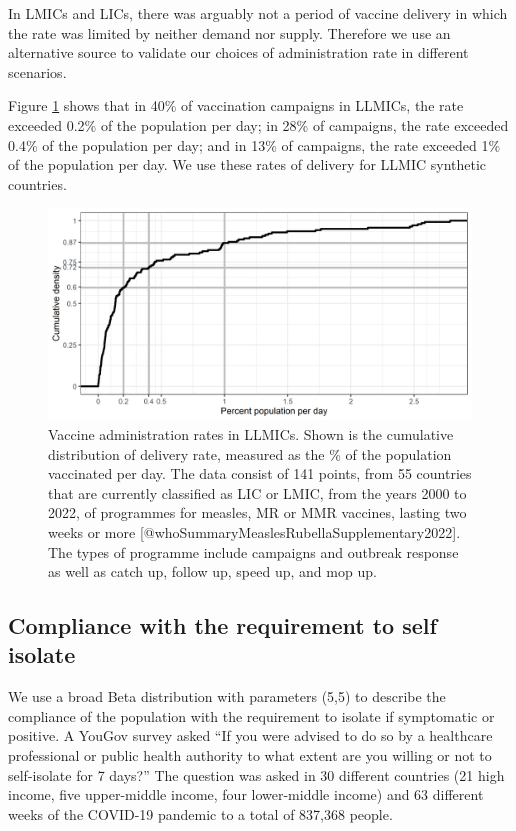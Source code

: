 \documentclass[
]{article}
\begin{document}
In LMICs and LICs, there was arguably not a period of vaccine delivery in which the rate was limited by neither demand nor supply. Therefore we use an alternative source to validate our choices of administration rate in different scenarios.

Figure \ref{fig:vaxratewho} shows that in 40\% of vaccination campaigns in LLMICs, the rate exceeded 0.2\% of the population per day; in 28\% of campaigns, the rate exceeded 0.4\% of the population per day; and in 13\% of campaigns, the rate exceeded 1\% of the population per day. We use these rates of delivery for LLMIC synthetic countries.

\begin{figure}
\includegraphics[width=0.8\linewidth]{README_files/figure-gfm/vaccinationrates} \caption{Vaccine administration rates in LLMICs. Shown is the cumulative distribution of delivery rate, measured as the \% of the population vaccinated per day. The data consist of 141 points, from 55 countries that are currently classified as LIC or LMIC, from the years 2000 to 2022, of programmes for measles, MR or MMR vaccines, lasting two weeks or more [@whoSummaryMeaslesRubellaSupplementary2022]. The types of programme include campaigns and outbreak response as well as catch up, follow up, speed up, and mop up.}\label{fig:vaxratewho}
\end{figure}

\subsection{Compliance with the requirement to self isolate}\label{compliance-with-the-requirement-to-self-isolate}

We use a broad Beta distribution with parameters (5,5) to describe the compliance of the population with the requirement to isolate if symptomatic or positive. A YouGov survey \citep{jonessarahpImperialCollegeLondon2020} asked ``If you were advised to do so by a healthcare professional or public health authority to what extent are you willing or not to self-isolate for 7 days?'' The question was asked in 30 different countries (21 high income, five upper-middle income, four lower-middle income) and 63 different weeks of the COVID-19 pandemic to a total of 837,368 people.
\end{document}
